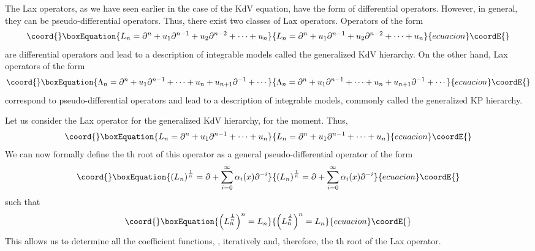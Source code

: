 \documentclass[a4paper,11pt]{article}
\begin{document}
The Lax operators, as we have seen earlier in the case of the KdV
equation, have the form of differential operators. However, in
general, they can be pseudo-differential operators. Thus, there exist
two classes of Lax operators. Operators of the form
\begin{equation}\coord{}\boxEquation{
L_{n} = \partial^{n} + u_{1} \partial^{n-1} + u_{2} \partial^{n-2} +
\cdots + u_{n}
}{
L_{n} = \partial^{n} + u_{1} \partial^{n-1} + u_{2} \partial^{n-2} +
\cdots + u_{n}
}{ecuacion}\coordE{}\end{equation}
are differential operators and lead to a description of integrable
models called the generalized KdV hierarchy. On the other hand, Lax
operators of the form
\begin{equation}\coord{}\boxEquation{
\Lambda_{n} = \partial^{n} + u_{1} \partial^{n-1} + \cdots + u_{n} +
u_{n+1} \partial^{-1} + \cdots
}{
\Lambda_{n} = \partial^{n} + u_{1} \partial^{n-1} + \cdots + u_{n} +
u_{n+1} \partial^{-1} + \cdots
}{ecuacion}\coordE{}\end{equation}
correspond to pseudo-differential operators and lead to a description
of integrable models, commonly called the generalized KP hierarchy.

Let us consider the Lax operator for the generalized KdV hierarchy,
for the moment. Thus,
\begin{equation}\coord{}\boxEquation{
L_{n} = \partial^{n} + u_{1} \partial^{n-1} + \cdots + u_{n}
}{
L_{n} = \partial^{n} + u_{1} \partial^{n-1} + \cdots + u_{n}
}{ecuacion}\coordE{}\end{equation}
We can now formally define the \coordHE{} th root of this operator as
a general pseudo-differential operator of the form
\begin{equation}\coord{}\boxEquation{
\left(L_{n}\right)^{1\over n} = \partial + \sum_{i=0}^{\infty}
\alpha_{i}(x) \partial^{-i}
}{
\left(L_{n}\right)^{1\over n} = \partial + \sum_{i=0}^{\infty}
\alpha_{i}(x) \partial^{-i}
}{ecuacion}\coordE{}\end{equation}
such that
\begin{equation}\coord{}\boxEquation{
\left(L_{n}^{1\over n}\right)^{n} = L_{n}
}{
\left(L_{n}^{1\over n}\right)^{n} = L_{n}
}{ecuacion}\coordE{}\end{equation}
This allows us to determine all the coefficient functions,
\coordHE{}, iteratively and, therefore, the \coordHE{} th root of the
Lax operator.
\end{document}

